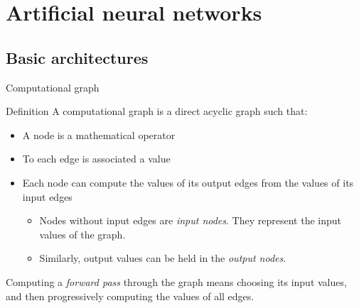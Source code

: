 \documentclass[xcolor=pdftex,dvipsnames,table,mathserif]{beamer}
\begin{document}
\section{Artificial neural networks}

\subsection{Basic architectures}

\begin{frame}{Computational graph}

\begin{block}{Definition}
  A computational graph is a direct acyclic graph such that:
  \begin{itemize}
  \item A node is a mathematical operator
  \item To each edge is associated a value
  \item Each node can compute the values of its output edges from the values of its input edges
    \begin{itemize}
    \item Nodes without input edges are \emph{input nodes}. They represent the input values of the graph.
    \item Similarly, output values can be held in the \emph{output nodes}.
    \end{itemize}
  \end{itemize}
\end{block}

Computing a \emph{forward pass} through the graph means choosing its input values, and then progressively computing the values of all edges.


\end{frame}
\end{document}

